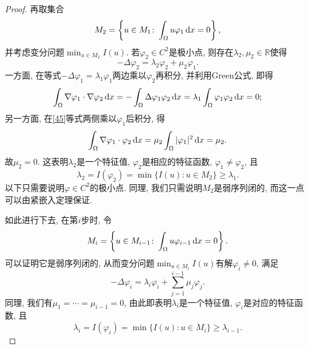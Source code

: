 \begin{theorem}
\begin{proof}
        再取集合 
        \begin{equation*}
            M_2 = \left\{u \in M_1\colon \int_{\Omega}u\varphi_1 \,{\rm d}x = 0\right\},
        \end{equation*}
        并考虑变分问题$\min_{u \in M_2}I(u)$. 若$\varphi_2 \in C^2$是极小点, 则存在$\lambda_2, \mu_2 \in \mathbb{R}$使得 
        \begin{equation}\label{45}
            -\Delta\varphi_2 = \lambda_2\varphi_2 + \mu_2\varphi_1.
        \end{equation} 
        一方面, 在等式$-\Delta\varphi_1 = \lambda_1\varphi_1$两边乘以$\varphi_2$再积分, 并利用Green公式, 即得 
        \begin{equation*}
            \int_{\Omega}\nabla\varphi_1 \cdot \nabla\varphi_2 \,{\rm d}x = -\int_{\Omega}\Delta\varphi_1\varphi_2 \,{\rm d}x = \lambda_1\int_{\Omega}\varphi_1\varphi_2 \,{\rm d}x = 0;
        \end{equation*}
        另一方面, 在\eqref{45}等式两侧乘以$\varphi_1$后积分, 得 
        \begin{equation*}
            \int_{\Omega}\nabla\varphi_1 \cdot \varphi_2 \,{\rm d}x = \mu_2\int_{\Omega}|\varphi_1|^2 \,{\rm d}x = \mu_2.
        \end{equation*}
        故$\mu_2 = 0$. 这表明$\lambda_2$是一个特征值, $\varphi_2$是相应的特征函数, $\varphi_1 \neq \varphi_2$, 且 
        \begin{equation*}
            \lambda_2 = I(\varphi_2) = \min\{I(u)\colon u \in M_2\} \geq \lambda_1.
        \end{equation*}
        以下只需要说明$\varphi \in C^2$的极小点. 同理, 我们只需说明$M_2$是弱序列闭的, 而这一点可以由紧嵌入定理保证.

        如此进行下去, 在第$i$步时, 令 
        \begin{equation*}
            M_i = \left\{u \in M_{i - 1}\colon \int_{\Omega}u\varphi_{i - 1} \,{\rm d}x = 0\right\}.
        \end{equation*}
        可以证明它是弱序列闭的, 从而变分问题$\min_{u \in M_i}I(u)$有解$\varphi_i \neq 0$, 满足 
        \begin{equation*}
            -\Delta\varphi_i = \lambda_i\varphi_i + \sum_{j = 1}^{i - 1}\mu_j\varphi_j.
        \end{equation*}
        同理, 我们有$\mu_1 = \cdots = \mu_{i - 1} = 0$, 由此即表明$\lambda_i$是一个特征值, $\varphi_i$是对应的特征函数, 且 
        \begin{equation*}
            \lambda_i = I(\varphi_i) = \min\{I(u)\colon u \in M_i\} \geq \lambda_{i - 1}.
        \end{equation*}


\end{proof}
\end{theorem}
